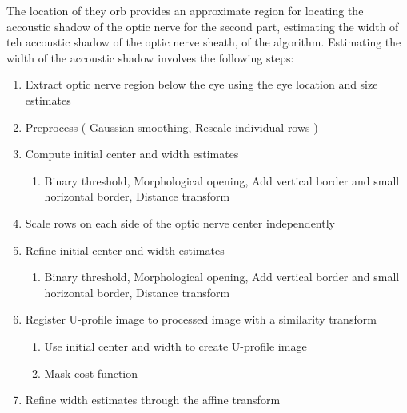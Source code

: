 \documentclass{llncs}
\begin{document}
The location of they orb provides an approximate region for locating the
accoustic shadow of the optic nerve for the second part, estimating the width of
teh accoustic shadow of the optic nerve sheath, of the algorithm. Estimating the
width of the accoustic shadow involves the following steps:
\begin{enumerate}
\item Extract optic nerve region below the eye using the eye location and size estimates
\item Preprocess ( Gaussian smoothing, Rescale individual rows )
\item Compute initial center and width estimates
  \begin{enumerate}
  \item Binary threshold, Morphological opening, Add vertical border and small horizontal border, Distance transform
  \end{enumerate}
\item Scale rows on each side of the optic nerve center independently
\item Refine initial center and width estimates
  \begin{enumerate}
  \item Binary threshold, Morphological opening, Add vertical border and small horizontal border, Distance transform
  \end{enumerate}
\item Register U-profile image to processed image with a similarity transform
  \begin{enumerate}
  \item Use initial center and width to create U-profile image
  \item Mask cost function
  \end{enumerate}
\item Refine width estimates through the affine transform
\end{enumerate}
\end{document}
